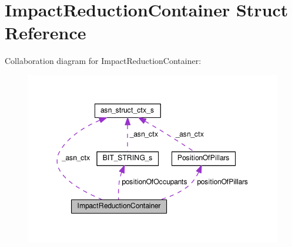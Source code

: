\hypertarget{structImpactReductionContainer}{}\section{Impact\+Reduction\+Container Struct Reference}
\label{structImpactReductionContainer}


Collaboration diagram for Impact\+Reduction\+Container\+:\nopagebreak
\begin{figure}[H]
\begin{center}
\leavevmode
\includegraphics[width=348pt]{structImpactReductionContainer__coll__graph}
\end{center}
\end{figure}

